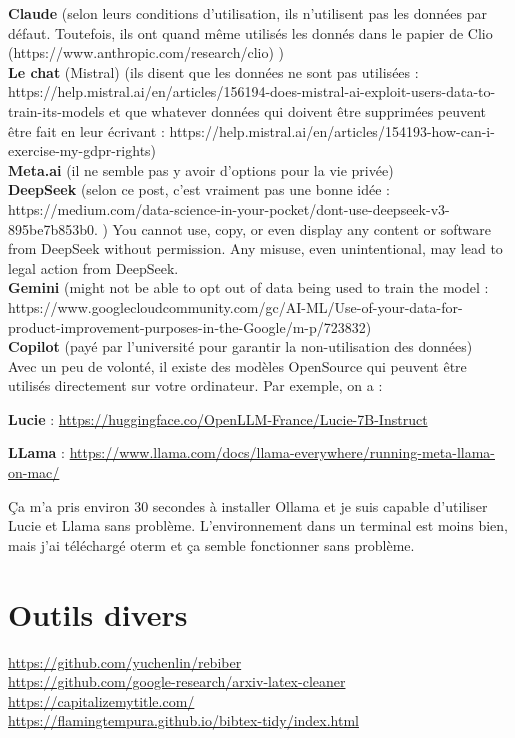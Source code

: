 \documentclass{book}
\begin{document}
\textbf{Claude} (selon leurs conditions d’utilisation, ils n’utilisent pas les données par défaut. Toutefois, ils ont quand même utilisés les donnés dans le papier de Clio (https://www.anthropic.com/research/clio) )\\

\textbf{Le chat} (Mistral) (ils disent que les données ne sont pas utilisées : https://help.mistral.ai/en/articles/156194-does-mistral-ai-exploit-users-data-to-train-its-models et que whatever données qui doivent être supprimées peuvent être fait en leur écrivant : https://help.mistral.ai/en/articles/154193-how-can-i-exercise-my-gdpr-rights)  \\

\textbf{Meta.ai} (il ne semble pas y avoir d’options pour la vie privée) \\

\textbf{DeepSeek} (selon ce post, c’est vraiment pas une bonne idée : https://medium.com/data-science-in-your-pocket/dont-use-deepseek-v3-895be7b853b0. ) 
You cannot use, copy, or even display any content or software from DeepSeek without permission.
Any misuse, even unintentional, may lead to legal action from DeepSeek. \\

 
\textbf{Gemini} (might not be able to opt out of data being used to train the model : https://www.googlecloudcommunity.com/gc/AI-ML/Use-of-your-data-for-product-improvement-purposes-in-the-Google/m-p/723832)  \\
\textbf{Copilot} (payé par l’université pour garantir la non-utilisation des données)\\


Avec un peu de volonté, il existe des modèles OpenSource qui peuvent être utilisés directement sur votre ordinateur. Par exemple, on a : 

\textbf{Lucie} : \url{https://huggingface.co/OpenLLM-France/Lucie-7B-Instruct}

\textbf{LLama} : \url{https://www.llama.com/docs/llama-everywhere/running-meta-llama-on-mac/}

Ça m'a pris environ 30 secondes à installer Ollama et je suis capable d'utiliser Lucie et Llama sans problème. L'environnement dans un terminal est moins bien, mais j'ai téléchargé oterm et ça semble fonctionner sans problème.
\section{Outils divers}
\url{https://github.com/yuchenlin/rebiber} \\
\url{https://github.com/google-research/arxiv-latex-cleaner}  \\
\url{https://capitalizemytitle.com/} \\
\url{https://flamingtempura.github.io/bibtex-tidy/index.html}  \\
\end{document}
